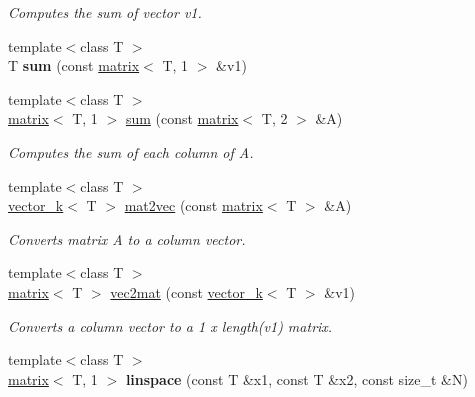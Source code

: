 \begin{DoxyCompactItemize}
\begin{DoxyCompactList}\small\item\em Computes the sum of vector v1. \end{DoxyCompactList}\item 
\hypertarget{namespacekeycpp_a1f2b77d5a0c3eb7c97254067015e843c}{{\footnotesize template$<$class T $>$ }\\T {\bfseries sum} (const \hyperlink{classkeycpp_1_1matrix}{matrix}$<$ T, 1 $>$ \&v1)}\label{namespacekeycpp_a1f2b77d5a0c3eb7c97254067015e843c}

\item 
\hypertarget{namespacekeycpp_a90f53f3dc1a16e2afc809f2510b35c00}{{\footnotesize template$<$class T $>$ }\\\hyperlink{classkeycpp_1_1matrix}{matrix}$<$ T, 1 $>$ \hyperlink{namespacekeycpp_a90f53f3dc1a16e2afc809f2510b35c00}{sum} (const \hyperlink{classkeycpp_1_1matrix}{matrix}$<$ T, 2 $>$ \&A)}\label{namespacekeycpp_a90f53f3dc1a16e2afc809f2510b35c00}

\begin{DoxyCompactList}\small\item\em Computes the sum of each column of A. \end{DoxyCompactList}\item 
\hypertarget{namespacekeycpp_a049d8e50ce9c2c5e0b7a0ad95cc559b3}{{\footnotesize template$<$class T $>$ }\\\hyperlink{classkeycpp_1_1vector__k}{vector\-\_\-k}$<$ T $>$ \hyperlink{namespacekeycpp_a049d8e50ce9c2c5e0b7a0ad95cc559b3}{mat2vec} (const \hyperlink{classkeycpp_1_1matrix}{matrix}$<$ T $>$ \&A)}\label{namespacekeycpp_a049d8e50ce9c2c5e0b7a0ad95cc559b3}

\begin{DoxyCompactList}\small\item\em Converts matrix A to a column vector. \end{DoxyCompactList}\item 
\hypertarget{namespacekeycpp_a6fb905e99ba06b2a005547e7f5d0f54f}{{\footnotesize template$<$class T $>$ }\\\hyperlink{classkeycpp_1_1matrix}{matrix}$<$ T $>$ \hyperlink{namespacekeycpp_a6fb905e99ba06b2a005547e7f5d0f54f}{vec2mat} (const \hyperlink{classkeycpp_1_1vector__k}{vector\-\_\-k}$<$ T $>$ \&v1)}\label{namespacekeycpp_a6fb905e99ba06b2a005547e7f5d0f54f}

\begin{DoxyCompactList}\small\item\em Converts a column vector to a 1 x length(v1) matrix. \end{DoxyCompactList}\item 
\hypertarget{namespacekeycpp_a3667b0575327bba14f481cd3524197fc}{{\footnotesize template$<$class T $>$ }\\\hyperlink{classkeycpp_1_1matrix}{matrix}$<$ T, 1 $>$ {\bfseries linspace} (const T \&x1, const T \&x2, const size\-\_\-t \&N)}\label{namespacekeycpp_a3667b0575327bba14f481cd3524197fc}


\end{DoxyCompactItemize}
